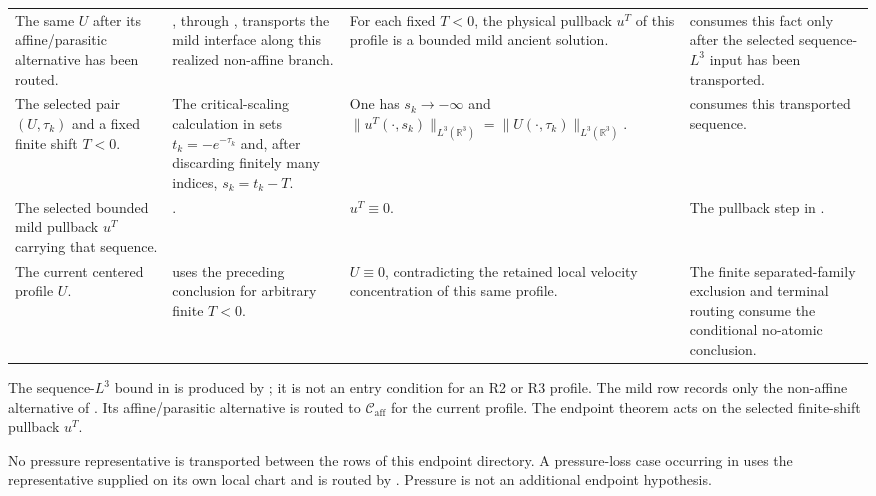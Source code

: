 \documentclass[11pt]{amsart}
\numberwithin{equation}{section}
\theoremstyle{plain}
\theoremstyle{definition}
\theoremstyle{remark}
\newcommand{\R}{\mathbb R}
\newcommand{\Caff}{\mathcal C_{\mathrm{aff}}}
\begin{document}
\begin{longtable}{@{}L{0.18\textwidth}L{0.30\textwidth}L{0.27\textwidth}L{0.17\textwidth}@{}}
The same \(U\) after its affine/parasitic alternative has been routed. &
, through
, transports the mild interface along this
realized non-affine branch. &
For each fixed \(T<0\), the physical pullback \(u^T\) of this profile is a
bounded mild ancient solution. &
 consumes this fact only after the selected
sequence-\(L^3\) input has been transported.\\

The selected pair \((U,\tau_k)\) and a fixed finite shift \(T<0\). &
The critical-scaling calculation in  sets
\(t_k=-e^{-\tau_k}\) and, after discarding finitely many indices,
\(s_k=t_k-T\). &
One has \(s_k\to-\infty\) and
\(\|u^T(\cdot,s_k)\|_{L^3(\R^3)}
=\|U(\cdot,\tau_k)\|_{L^3(\R^3)}\). &
 consumes this transported sequence.\\

The selected bounded mild pullback \(u^T\) carrying that sequence. &
. &
\(u^T\equiv0\). &
The pullback step in .\\

The current centered profile \(U\). &
 uses the preceding conclusion for arbitrary
finite \(T<0\). &
\(U\equiv0\), contradicting the retained local velocity concentration of
this same profile. &
The finite separated-family exclusion and terminal routing consume the
conditional no-atomic conclusion.\\
\hline
\end{longtable}
\endgroup

The sequence-\(L^3\) bound in
 is produced by
; it is not an entry condition for an R2 or R3
profile.  The mild row records only the non-affine alternative of
.  Its affine/parasitic alternative is
routed to \(\Caff\) for the current profile.  The endpoint theorem acts on the
selected finite-shift pullback \(u^T\).

No pressure representative is transported between the rows of this endpoint
directory.  A pressure-loss case occurring in
 uses the representative supplied on its own
local chart and is routed by .
Pressure is not an additional endpoint hypothesis.
\end{document}
